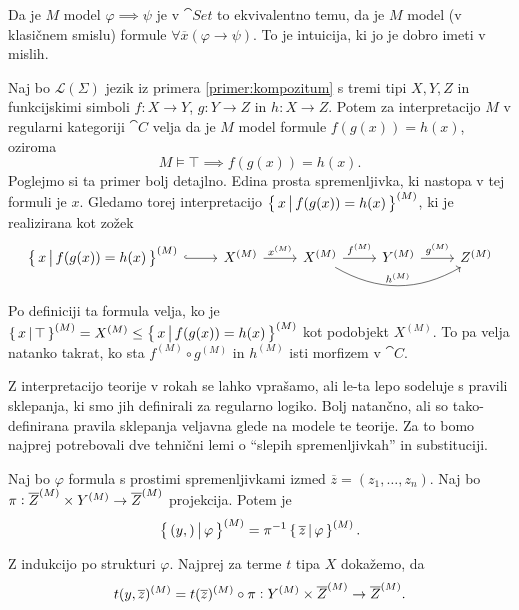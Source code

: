 \documentclass[../kategoricna_logika.tex]{subfiles}
\begin{document}
Da je $M$ model $\varphi \implies \psi$ je v $\cat{Set}$ to ekvivalentno temu, da je $M$ model (v klasičnem smislu) formule $\forall \overline{x} (\varphi \rightarrow \psi)$. To je intuicija, ki jo je dobro imeti v mislih.
\begin{primer}
  Naj bo $\mathcal{L}(\Sigma)$ jezik iz primera \ref{primer:kompozitum} s tremi tipi $X,Y,Z$ in funkcijskimi simboli $f : X \to Y$, $g : Y \to Z$ in $h : X \to Z$. Potem za interpretacijo $M$ v regularni kategoriji $\cat{C}$ velja da je $M$ model formule $f(g(x)) = h(x)$, oziroma
  $$M \models \top \implies f(g(x)) = h(x).$$ 
  Poglejmo si ta primer bolj detajlno.
  Edina prosta spremenljivka, ki nastopa v tej formuli je $x$. Gledamo torej interpretacijo
  $\left\lbrace\,x \,\middle|\, f(g(x)) = h(x)\,\right\rbrace^{(M)}$, ki je realizirana kot zožek 
  \begin{equation*}
    \begin{tikzcd}
      \set{x \,\middle|\, f(g(x)) = h(x)}^{(M)} \ar[r, hook] & X^{(M)} \ar[r, "x^{(M)}"] & X^{(M)} \ar[r, "f^{(M)}"] \ar[rr, bend right, "h^{(M)}"] & Y^{(M)} \ar[r, "g^{(M)}"] & Z^{(M)}
    \end{tikzcd}
  \end{equation*}
  Po definiciji ta formula velja, ko je $\left\lbrace\,x \,\middle|\, \top\,\right\rbrace^{(M)} = X^{(M)} \leq \left\lbrace\,x \,\middle|\, f(g(x)) = h(x)\,\right\rbrace^{(M)}$ kot podobjekt $X^{(M)}$.
  To pa velja natanko takrat, ko sta $f^{(M)} \circ g^{(M)}$ in $h^{(M)}$ isti morfizem v $\cat{C}$.
\end{primer}
Z interpretacijo teorije v rokah se lahko vprašamo, ali le-ta lepo sodeluje s pravili sklepanja, ki smo jih definirali za regularno logiko.
Bolj natančno, ali so tako-definirana pravila sklepanja veljavna glede na modele te teorije.
Za to bomo najprej potrebovali dve tehnični lemi o ``slepih spremenljivkah'' in substituciji.
\begin{lema}
  Naj bo $\varphi$ formula s prostimi spremenljivkami izmed $\overline{z} = (z_1, \ldots, z_n)$.
  Naj bo $\pi : \overline{Z}^{(M)} \times Y^{(M)} \to {\overline{Z}}^{(M)}$ projekcija. Potem je
  $$\left\lbrace\,(y, \overline{}) \,\middle|\, \varphi\,\right\rbrace^{(M)} = \pi^{-1} \left\lbrace\,\overline{z} \,\middle|\, \varphi\,\right\rbrace^{(M)}.$$
\end{lema}
\begin{dokaz}
  Z indukcijo po strukturi $\varphi$. Najprej za terme $t$ tipa $X$ dokažemo, da
  $$t(y, \overline{z})^{(M)} = t(\overline{z})^{(M)} \circ \pi : Y^{(M)} \times {\overline{Z}}^{(M)} \to {\overline{Z}}^{(M)}.$$
\end{dokaz}
\end{document}

